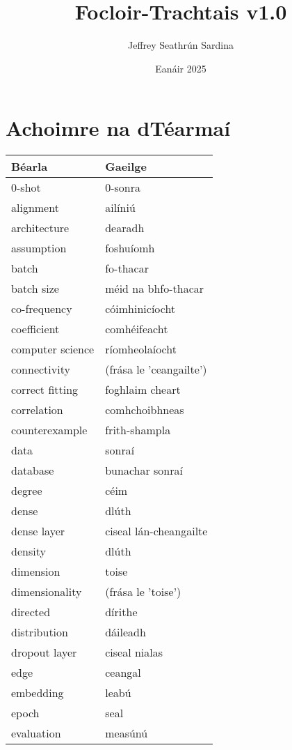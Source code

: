 \documentclass{article}
\title{Focloir-Trachtais v1.0}
\author{Jeffrey Seathrún Sardina}
\date{Eanáir 2025}
\begin{document}
            \maketitle
        
\section{Achoimre na dTéarmaí}\begin{longtable}{|l|l|}
	\hline
		\textbf{Béarla} & \textbf{Gaeilge}\\ \hline 
		0-shot&0-sonra\\ \hline 
		alignment&ailíniú\\ \hline 
		architecture&dearadh\\ \hline 
		assumption&foshuíomh\\ \hline 
		batch&fo-thacar\\ \hline 
		batch size&méid na bhfo-thacar\\ \hline 
		co-frequency&cóimhinicíocht\\ \hline 
		coefficient&comhéifeacht\\ \hline 
		computer science&ríomheolaíocht\\ \hline 
		connectivity&(frása le 'ceangailte')\\ \hline 
		correct fitting&foghlaim cheart\\ \hline 
		correlation&comhchoibhneas\\ \hline 
		counterexample&frith-shampla\\ \hline 
		data&sonraí\\ \hline 
		database&bunachar sonraí\\ \hline 
		degree&céim\\ \hline 
		dense&dlúth\\ \hline 
		dense layer&ciseal lán-cheangailte\\ \hline 
		density&dlúth\\ \hline 
		dimension&toise\\ \hline 
		dimensionality&(frása le 'toise')\\ \hline 
		directed&dírithe\\ \hline 
		distribution&dáileadh\\ \hline 
		dropout layer&ciseal nialas\\ \hline 
		edge&ceangal\\ \hline 
		embedding&leabú\\ \hline 
		epoch&seal\\ \hline 
		evaluation&measúnú\\ \hline 

\end{longtable}
\end{document}
